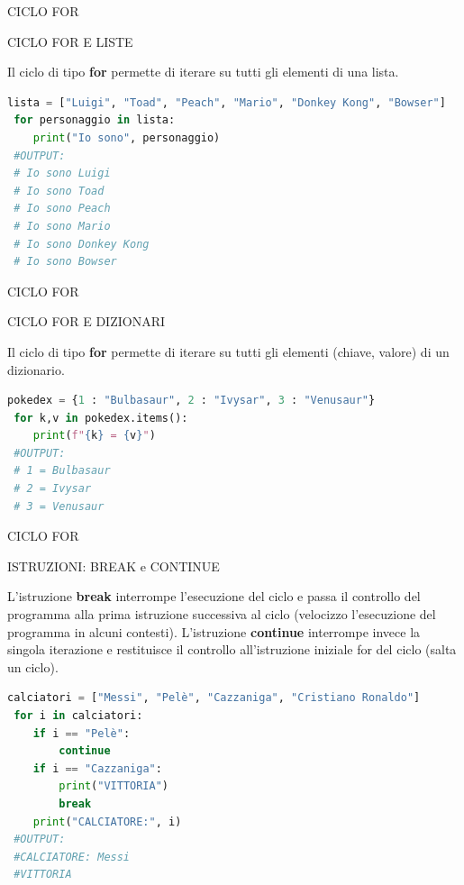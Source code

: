 \documentclass[aspectratio=1610]{beamer}
\begin{document}
\begin{frame}[fragile]{CICLO FOR}
    \begin{alertblock}{CICLO FOR E LISTE}
        \begin{minipage}{0.98\linewidth}
            \justifying
            Il ciclo di tipo \textbf{for} permette di iterare su tutti gli elementi di una lista.
\begin{lstlisting}[language=Python]
 lista = ["Luigi", "Toad", "Peach", "Mario", "Donkey Kong", "Bowser"]
 for personaggio in lista:
    print("Io sono", personaggio)
 #OUTPUT:
 # Io sono Luigi
 # Io sono Toad
 # Io sono Peach
 # Io sono Mario
 # Io sono Donkey Kong
 # Io sono Bowser
\end{lstlisting}
        \end{minipage}
    \end{alertblock}
\end{frame}

\begin{frame}[fragile]{CICLO FOR}
    \begin{alertblock}{CICLO FOR E DIZIONARI}
        \begin{minipage}{0.98\linewidth}
            \justifying
            Il ciclo di tipo \textbf{for} permette di iterare su tutti gli elementi (chiave, valore) di un dizionario.
\begin{lstlisting}[language=Python]
 pokedex = {1 : "Bulbasaur", 2 : "Ivysar", 3 : "Venusaur"}
 for k,v in pokedex.items():
    print(f"{k} = {v}")
 #OUTPUT:
 # 1 = Bulbasaur
 # 2 = Ivysar
 # 3 = Venusaur
\end{lstlisting}
        \end{minipage}
    \end{alertblock}
\end{frame}

\begin{frame}[fragile]{CICLO FOR}
    \begin{alertblock}{ISTRUZIONI: BREAK e CONTINUE}
        \begin{minipage}{0.98\linewidth}
            \justifying
            L'istruzione \textbf{break} interrompe l'esecuzione del ciclo e passa il controllo del 
            programma alla prima istruzione successiva al ciclo (velocizzo l'esecuzione del programma 
            in alcuni contesti). L'istruzione \textbf{continue} interrompe invece la singola iterazione e 
            restituisce il controllo all'istruzione iniziale for del ciclo (salta un ciclo).
            \pause
\begin{lstlisting}[language=Python]
calciatori = ["Messi", "Pelè", "Cazzaniga", "Cristiano Ronaldo"]
 for i in calciatori:
    if i == "Pelè":
        continue
    if i == "Cazzaniga":
        print("VITTORIA")
        break
    print("CALCIATORE:", i)
 #OUTPUT:
 #CALCIATORE: Messi
 #VITTORIA
\end{lstlisting}
        \end{minipage}
    \end{alertblock}
\end{frame}
\end{document}
